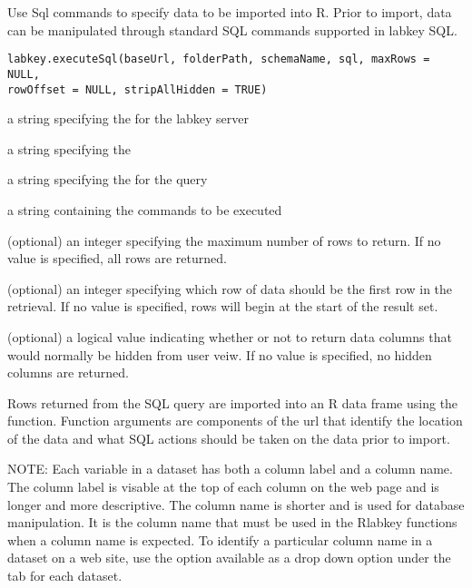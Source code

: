 \documentclass{article}
\begin{document}
\begin{Description}\relax
Use Sql commands to specify data to be imported into R. Prior to import, data can
be manipulated through standard SQL commands supported in labkey SQL.
\end{Description}
\begin{Usage}
\begin{verbatim}
labkey.executeSql(baseUrl, folderPath, schemaName, sql, maxRows = NULL, 
rowOffset = NULL, stripAllHidden = TRUE)
\end{verbatim}
\end{Usage}
\begin{Arguments}
\begin{ldescription}
\item[\code{baseUrl}] a string specifying the for the labkey server
\item[\code{folderPath}] a string specifying the  
\item[\code{schemaName}] a string specifying the   for the query
\item[\code{sql}] a string containing the  commands to be executed
\item[\code{maxRows}] (optional) an integer specifying the maximum number of rows to return. If no value is specified, all rows are returned.
\item[\code{rowOffset}] (optional) an integer specifying which row of data should be the first row in the retrieval. 
If no value is specified, rows will begin at the start of the result set.
\item[\code{stripAllHidden}] (optional) a logical value indicating whether or not to return data columns that would 
normally be hidden from user veiw. If no value is specified, no hidden columns are returned.
\end{ldescription}
\end{Arguments}
\begin{Details}\relax
Rows returned from the SQL query are imported into an R data frame using the 
function. Function arguments are components of the url that identify the location of the
data and what SQL actions should be taken on the data prior to import.


NOTE: Each variable in a dataset has both a column label and a column name. The column label is visable at the top
of each column on the web page and is longer and more descriptive. The column name is shorter and is
used  for database manipulation. It is the column name that must be used in
the Rlabkey functions when a column name is expected. To identify a particular column name in a dataset on
a web site, use the  option available as a drop down option under the 
tab for each dataset.
\end{Details}
\end{document}
